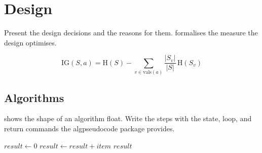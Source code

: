 \chapter{Design}
Present the design decisions and the reasons for them.  formalises the measure the design optimises.

\begin{equation}
  \label{eq:information-gain}
  \mathrm{IG}(S, a) = \mathrm{H}(S) - \sum_{v \in \mathrm{vals}(a)}
  \frac{|S_v|}{|S|}\,\mathrm{H}(S_v)
\end{equation}

\section{Algorithms}
 shows the shape of an algorithm float. Write the steps with the state, loop, and return commands the algpseudocode package provides.

\begin{algorithm}[htbp]
  \caption{A sample algorithm float.}
  \label{alg:sample}
  \begin{algorithmic}[1]
    \State $result \gets 0$
      \State $result \gets result + item$
    \EndFor
    \State \Return $result$
  \end{algorithmic}
\end{algorithm}

